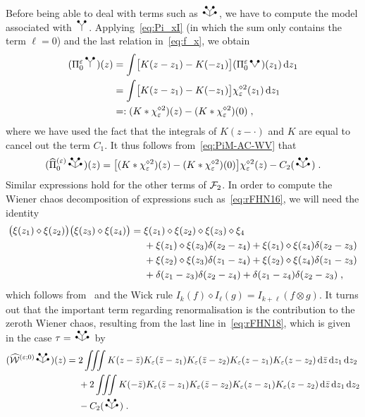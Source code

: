 \documentclass[reqno,11pt]{article}
\begin{document}
Before being able to deal with terms such as $\RSWV$, we have to compute the
model associated with $\RSY$. Applying~\eqref{eq:Pi_xI} (in which the sum only
contains the term $\ell=0$) and the last relation in~\eqref{eq:f_x}, we obtain 
\begin{align}
\nonumber
 (\Pi_0^\eps \RSY)(z)
 &= \int \bigbrak{K(z-z_1) - K(-z_1)} (\Pi_0^\eps \RSV)(z_1)\6z_1 \\
\nonumber
 &= \int \bigbrak{K(z-z_1) - K(-z_1)} \chi_\eps^{\diamond 2}(z_1)\6z_1 \\
 &=: (K*\chi_\eps^{\diamond 2})(z) - (K*\chi_\eps^{\diamond 2})(0)\;,
 \label{eq:rFHN15}
\end{align} 
where we have used the fact that the integrals of $K(z-\cdot)$ and $K$ are
equal to cancel out the term $C_1$. It thus follows from~\eqref{eq:PiM-AC-WV}
that 
\begin{equation}
 \label{eq:rFHN16}
 (\widehat\Pi_0^{(\eps)} \RSWV)(z)
 = \bigbrak{(K*\chi_\eps^{\diamond 2})(z) - (K*\chi_\eps^{\diamond 2})(0)}
 \chi_\eps^{\diamond 2}(z) - C_2(\RSWV)\;.
\end{equation} 
Similar expressions hold for the other terms of ${\mathcal F}_2$.
In order to compute the Wiener chaos decomposition of expressions such
as~\eqref{eq:rFHN16}, we will need the identity 
\begin{align}
\nonumber
\bigpar{\xi(z_1)\diamond\xi(z_2)} \bigpar{\xi(z_3)\diamond\xi(z_4)} 
 {}={} & \xi(z_1)\diamond\xi(z_2)\diamond\xi(z_3)\diamond\xi_4 \\
\nonumber
 & {}+ \xi(z_1)\diamond\xi(z_3)\delta(z_2-z_4) 
 + \xi(z_1)\diamond\xi(z_4)\delta(z_2-z_3)\\
\nonumber
 & {}+ \xi(z_2)\diamond\xi(z_3)\delta(z_1-z_4)
 + \xi(z_2)\diamond\xi(z_4)\delta(z_1-z_3)\\ 
 & {}+  \delta(z_1-z_3)\delta(z_2-z_4) + \delta(z_1-z_4)\delta(z_2-z_3)\;,
\label{eq:rFHN18} 
\end{align} 
which follows from~\cite[Lemma~10.3]{Hairer2014} and the Wick rule 
$I_k(f)\diamond I_\ell(g) = I_{k+\ell}(f\otimes g)$. 
It turns out that the important term regarding renormalisation is the
contribution to the zeroth Wiener chaos, resulting from the last line
in~\eqref{eq:rFHN18}, which is given in the case $\tau=\RSWV$ by 
\begin{align}
\nonumber
(\widehat \cW^{(\eps;0)}\RSWV)(z) 
{}={} & 2\iiint K(z-\bar z)K_\eps(\bar z-z_1)K_\eps(\bar z-z_2)
K_\eps(z-z_1)K_\eps(z-z_2)\6\bar z\6z_1\6z_2 \\
\nonumber
& {}+ 2\iiint K(-\bar z)K_\eps(\bar z-z_1)K_\eps(\bar z-z_2)
K_\eps(z-z_1)K_\eps(z-z_2)\6\bar z\6z_1\6z_2\\
& {}- C_2(\RSWV)\;.
\label{eq:rFHN19} 
\end{align}
\end{document}
